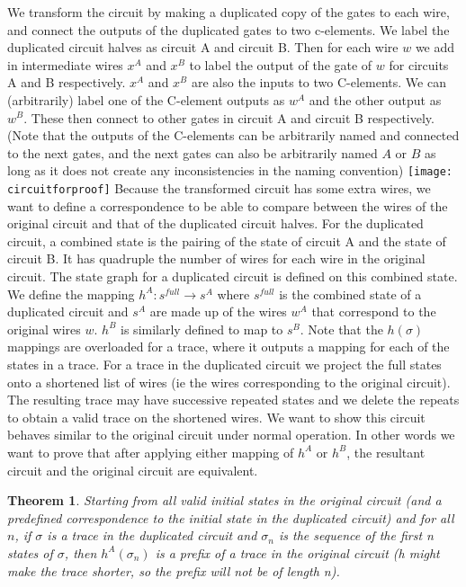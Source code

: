 \documentclass{article}
\newtheorem*{theorem}{Theorem}
\begin{document}
We transform the circuit by making a duplicated copy of the gates to each wire, and connect the outputs of the duplicated gates to two c-elements.  We label the duplicated circuit halves as circuit A and circuit B.  Then for each wire $w$ we add in intermediate wires $x^A$ and $x^B$ to label the output of the gate of $w$ for circuits A and B respectively.  $x^A$ and $x^B$ are also the inputs to two C-elements.  We can (arbitrarily) label one of the C-element outputs as $w^A$ and the other output as $w^B$.  These then connect to other gates in circuit A and circuit B respectively.  (Note that the outputs of the C-elements can be arbitrarily named and connected to the next gates, and the next gates can also be arbitrarily named $A$ or $B$ as long as it does not create any inconsistencies in the naming convention) %
\newline
\texttt{[image: circuitforproof]}
Because the transformed circuit has some extra wires, we want to define a correspondence to be able to compare between the wires of the original circuit and that of the duplicated circuit halves.  For the duplicated circuit, a combined state is the pairing of the state of circuit A and the state of circuit B. It has quadruple the number of wires for each wire in the original circuit.  The state graph for a duplicated circuit is defined on this combined state.  We define the mapping $h^A: s^{full} \to s^A$ where $s^{full}$ is the combined state of a duplicated circuit and $s^A$ are made up of the wires $w^A$ that correspond to the original wires $w$.  $h^B$ is similarly defined to map to $s^B$.  Note that the $h(\sigma)$ mappings are overloaded for a trace, where it outputs a mapping for each of the states in a trace.%
For a trace in the duplicated circuit we project the full states onto a shortened list of wires (ie the wires corresponding to the original circuit). The resulting trace may have successive repeated states and we delete the repeats to obtain a valid trace on the shortened wires.  %
\newline
We want to show this circuit behaves similar to the original circuit under normal operation.  In other words we want to prove that after applying either mapping of $h^A$ or $h^B$, the resultant circuit and the original circuit are equivalent.  
\begin{theorem}Starting from all valid initial states in the original circuit (and a predefined correspondence to the initial state in the duplicated circuit) and for all $n$, if $\sigma$ is a trace in the duplicated circuit and $\sigma_n$ is the sequence of the first n states of $\sigma$, then $h^A(\sigma_n)$ is a prefix of a trace in the original circuit  (h might make the trace shorter, so the prefix will not be of length n).  
\end{theorem}
\end{document}
